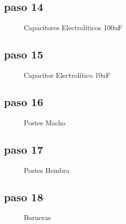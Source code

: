 \documentclass[letterpaper,10pt,english]{sphinxmanual}
\begin{document}
\subsection{paso 14}
\label{np07:paso-14}\begin{figure}[htbp]
\centering
\capstart

\noindent{}
\caption{Capacitores Electrolíticos 100uF}\label{np07:id20}\end{figure}
\newpage

\subsection{paso 15}
\label{np07:paso-15}\begin{figure}[htbp]
\centering
\capstart

\noindent{}
\caption{Capacitor Electrolítico 10uF}\label{np07:id21}\end{figure}
\newpage

\subsection{paso 16}
\label{np07:paso-16}\begin{figure}[htbp]
\centering
\capstart

\noindent{}
\caption{Postes Macho}\label{np07:id22}\end{figure}
\newpage

\subsection{paso 17}
\label{np07:paso-17}\begin{figure}[htbp]
\centering
\capstart

\noindent{}
\caption{Postes Hembra}\label{np07:id23}\end{figure}
\newpage

\subsection{paso 18}
\label{np07:paso-18}\begin{figure}[htbp]
\centering
\capstart

\noindent{}
\caption{Borneras}\label{np07:id24}\end{figure}
\newpage
\end{document}
